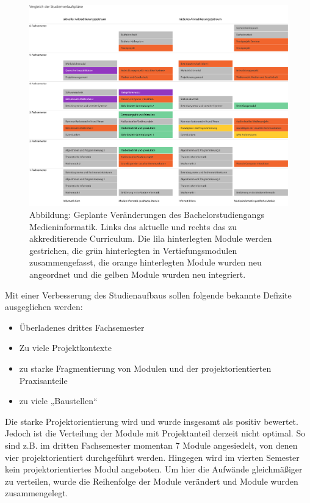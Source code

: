 \begin{figure}[htbp][htbp]
\centering
\includegraphics[width=\columnwidth]{../anhaenge/bilder/ba-veraenderungen-studienverlaufsplan.pdf}
\caption{Abbildung: Geplante Veränderungen des Bachelorstudiengangs
Medieninformatik. Links das aktuelle und rechts das zu akkreditierende
Curriculum. Die lila hinterlegten Module werden gestrichen, die grün
hinterlegten in Vertiefungsmodulen zusammengefasst, die orange
hinterlegten Module wurden neu angeordnet und die gelben Module wurden
neu integriert.}
\end{figure}

Mit einer Verbesserung des Studienaufbaus sollen folgende bekannte
Defizite ausgeglichen werden:

\begin{itemize}
\tightlist
\item
  Überladenes drittes Fachsemester
\item
  Zu viele Projektkontexte
\item
  zu starke Fragmentierung von Modulen und der projektorientierten
  Praxisanteile
\item
  zu viele „Baustellen``
\end{itemize}

Die starke Projektorientierung wird und wurde insgesamt als positiv
bewertet. Jedoch ist die Verteilung der Module mit Projektanteil derzeit
nicht optimal. So sind z.B. im dritten Fachsemester momentan 7 Module
angesiedelt, von denen vier projektorientiert durchgeführt werden.
Hingegen wird im vierten Semester kein projektorientiertes Modul
angeboten. Um hier die Aufwände gleichmäßiger zu verteilen, wurde die
Reihenfolge der Module verändert und Module wurden zusammengelegt.

